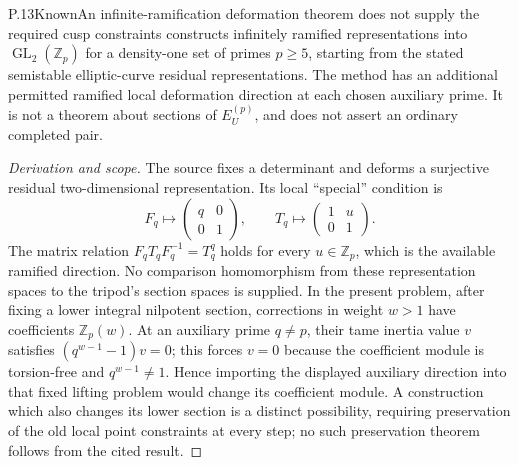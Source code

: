 \begin{result}{P.13}{Known}{An infinite-ramification deformation theorem does not supply the required cusp constraints}
\citet[Theorem~1, p.794; local deformation calculation and
Proposition~1, pp.796--798]{RootRamakrishna2000} constructs infinitely
ramified representations into \(\operatorname{GL}_2(\mathbb Z_p)\)
for a density-one set of primes \(p\ge5\), starting from the stated
semistable elliptic-curve residual representations. The method has
an additional permitted ramified local deformation direction at each
chosen auxiliary prime. It is not a theorem about sections of
\(E_U^{(p)}\), and does not assert an ordinary completed pair.
\end{result}
\begin{proof}[Derivation and scope]
The source fixes a determinant and deforms a surjective residual
two-dimensional representation. Its local ``special'' condition is
\[
 F_q\longmapsto\begin{pmatrix}q&0\\0&1\end{pmatrix},
 \qquad T_q\longmapsto\begin{pmatrix}1&u\\0&1\end{pmatrix}.
\]
The matrix relation \(F_qT_qF_q^{-1}=T_q^q\) holds for every
\(u\in\mathbb Z_p\), which is the available ramified direction.
No comparison homomorphism from these representation spaces to the
tripod's section spaces is supplied. In the present problem, after
fixing a lower integral nilpotent section, corrections in weight
\(w>1\) have coefficients \(\mathbb Z_p(w)\). At an auxiliary prime
\(q\ne p\), their tame inertia
value \(v\) satisfies \((q^{w-1}-1)v=0\); this forces \(v=0\)
because the coefficient module is torsion-free and \(q^{w-1}\ne1\).
Hence importing the displayed auxiliary direction into that fixed
lifting problem would change its coefficient module. A construction
which also changes its lower section is a distinct possibility,
requiring preservation of the old local point constraints at every
step; no such preservation theorem follows from the cited result.
\end{proof}
